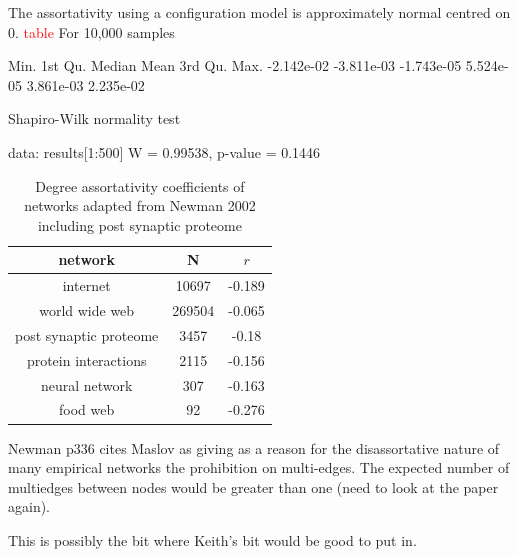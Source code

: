 The assortativity using a configuration model  is approximately normal centred on 0.
\textcolor{red}{table}
For 10,000 samples   

Min.    1st Qu.     Median       Mean    3rd Qu.       Max. 
-2.142e-02 -3.811e-03 -1.743e-05  5.524e-05  3.861e-03  2.235e-02 

Shapiro-Wilk normality test

data:  results[1:500]
W = 0.99538, p-value = 0.1446


\begin{table}[]
    \centering
    \begin{tabular}{c|c|c}
       network  &N& $r$  \\
       \hline
       internet & 10697&-0.189\\
       world wide web &269504 & -0.065\\
       post synaptic proteome & 3457 & -0.18\\
       protein interactions & 2115 & -0.156\\
       neural network & 307 & -0.163\\
       food web & 92 & -0.276 \\
       
       
         
    \end{tabular}
    \caption{Degree assortativity coefficients of networks adapted from Newman 2002 \cite{newman2002assortative} including post synaptic proteome}
    \label{Table:DegreeAssortativityNewman}
\end{table}

 


Newman \cite{newman2018networks} p336 cites Maslov \cite{maslov2004detection} as giving as a reason for the disassortative nature of many empirical networks the prohibition on multi-edges. The expected number of multiedges between nodes would be greater than one (need to look at the paper again).

This is possibly the bit where Keith's bit would be good to put in.  
%
%
%

